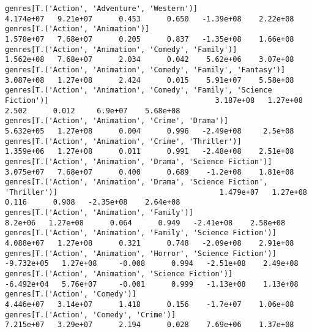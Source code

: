 \documentclass[11pt]{article}
\begin{document}
\begin{Verbatim}[commandchars=\\\{\}]
genres[T.('Action', 'Adventure', 'Western')]                                                                  4.174e+07   9.21e+07      0.453      0.650   -1.39e+08    2.22e+08
genres[T.('Action', 'Animation')]                                                                             1.578e+07   7.68e+07      0.205      0.837   -1.35e+08    1.66e+08
genres[T.('Action', 'Animation', 'Comedy', 'Family')]                                                         1.562e+08   7.68e+07      2.034      0.042    5.62e+06    3.07e+08
genres[T.('Action', 'Animation', 'Comedy', 'Family', 'Fantasy')]                                              3.087e+08   1.27e+08      2.424      0.015    5.91e+07    5.58e+08
genres[T.('Action', 'Animation', 'Comedy', 'Family', 'Science Fiction')]                                      3.187e+08   1.27e+08      2.502      0.012     6.9e+07    5.68e+08
genres[T.('Action', 'Animation', 'Crime', 'Drama')]                                                           5.632e+05   1.27e+08      0.004      0.996   -2.49e+08     2.5e+08
genres[T.('Action', 'Animation', 'Crime', 'Thriller')]                                                        1.359e+06   1.27e+08      0.011      0.991   -2.48e+08    2.51e+08
genres[T.('Action', 'Animation', 'Drama', 'Science Fiction')]                                                 3.075e+07   7.68e+07      0.400      0.689    -1.2e+08    1.81e+08
genres[T.('Action', 'Animation', 'Drama', 'Science Fiction', 'Thriller')]                                     1.479e+07   1.27e+08      0.116      0.908   -2.35e+08    2.64e+08
genres[T.('Action', 'Animation', 'Family')]                                                                     8.2e+06   1.27e+08      0.064      0.949   -2.41e+08    2.58e+08
genres[T.('Action', 'Animation', 'Family', 'Science Fiction')]                                                4.088e+07   1.27e+08      0.321      0.748   -2.09e+08    2.91e+08
genres[T.('Action', 'Animation', 'Horror', 'Science Fiction')]                                               -9.732e+05   1.27e+08     -0.008      0.994   -2.51e+08    2.49e+08
genres[T.('Action', 'Animation', 'Science Fiction')]                                                         -6.492e+04   5.76e+07     -0.001      0.999   -1.13e+08    1.13e+08
genres[T.('Action', 'Comedy')]                                                                                4.446e+07   3.14e+07      1.418      0.156    -1.7e+07    1.06e+08
genres[T.('Action', 'Comedy', 'Crime')]                                                                       7.215e+07   3.29e+07      2.194      0.028    7.69e+06    1.37e+08

\end{Verbatim}
\end{document}
